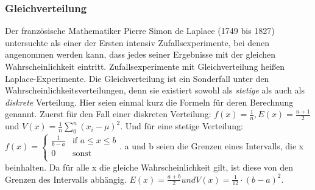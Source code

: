 \documentclass[letterpaper, titlepage]{article}
\begin{document}
\subsubsection{Gleichverteilung}\label{Gleichverteilung}
Der französische Mathematiker Pierre Simon de Laplace (1749 bis 1827) untersuchte als einer der Ersten intensiv Zufallsexperimente, bei denen angenommen werden kann, dass jedes seiner Ergebnisse mit der gleichen Wahrscheinlichkeit eintritt. Zufallsexperimente mit Gleichverteilung heißen Laplace-Experimente. Die Gleichverteilung ist ein Sonderfall unter den Wahrscheinlichkeitsverteilungen, denn sie existiert sowohl als \textit{stetige} als auch als \textit{diskrete} Verteilung. Hier seien einmal kurz die Formeln für deren Berechnung genannt. Zuerst für den Fall einer diskreten Verteilung:
$f(x)=\frac{1}{n}, E(x)=\frac{n+1}{2}$ und $V(x)=\frac{1}{n}\sum_{0}^{n}(x_i-\mu)^2$. Und für eine stetige Verteilung: 
$f(x)=
\begin{cases}
    \frac{1}{b-a} & \text{if } a \leq x \leq b \\
    0 & \text{sonst} \\
\end{cases}$. a und b seien die Grenzen eines Intervalls, die x beinhalten. Da für alle x die gleiche Wahrscheinlichkeit gilt, ist diese von den Grenzen des Intervalls abhängig. $E(x)=\frac{a+b}{2} und V(x)=\frac{1}{12}\cdot (b-a)^2$.
\end{document}
